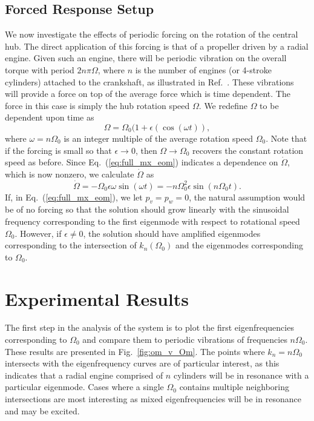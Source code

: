 \subsection{Forced Response Setup}
We now investigate the effects of periodic forcing on the rotation of the central hub. The direct application of this  forcing is that of a propeller driven by a radial engine. Given such an engine, there will be periodic vibration on the overall torque with period $2n\pi\Omega$, where $n$ is the number of engines (or 4-stroke cylinders) attached to the crankshaft, as illustrated in Ref.~\cite{von1959theory}. These vibrations will provide a force on top of the average force which is time dependent. The force in this case is simply the hub rotation speed $\Omega$. We redefine $\Omega$ to be dependent upon time as
\begin{equation}
\label{eq:rotation_eqn}
\Omega = \Omega_0(1+\epsilon(\cos(\omega t)),
\end{equation}
where $\omega = n\Omega_0$ is an integer multiple of the average rotation speed $\Omega_0$. Note that if the forcing is small so that $\epsilon\to 0$, then $\Omega\to\Omega_0$ recovers the constant rotation speed as before. Since Eq.~(\ref{eq:full_mx_eom}) indicates a dependence on $\dot\Omega$, which is now nonzero, we calculate $\dot \Omega$ as
\begin{equation}
\dot \Omega = -\Omega_0\epsilon\omega\sin(\omega t) = -n\Omega_0^2\epsilon\sin(n\Omega_0 t).
\end{equation}
If, in Eq.~(\ref{eq:full_mx_eom}), we let $p_v=p_w=0$, the natural assumption would be of no forcing so that the solution should grow linearly with the sinusoidal frequency corresponding to the first eigenmode with respect to rotational speed $\Omega_0$. However, if $\epsilon\neq 0$, the solution should have amplified eigenmodes corresponding to the intersection of $k_n(\Omega_0)$ and the eigenmodes corresponding to $\Omega_0$. 

\section{Experimental Results}
\label{sec:results}
The first step in the analysis of the system is to plot the first eigenfrequencies corresponding to $\Omega_0$ and compare them to periodic vibrations of frequencies $n\Omega_0$. These results are presented in Fig.~\ref{fig:om_v_Om}. The points where $k_n = n\Omega_0$ intersects with the eigenfrequency curves are of particular interest, as this indicates that a radial engine comprised of $n$ cylinders will be in resonance with a particular eigenmode. Cases where a single $\Omega_0$ contains multiple neighboring intersections are most interesting as mixed eigenfrequencies will be in resonance and may be excited. 


